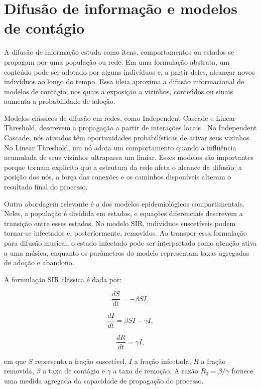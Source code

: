
\section{Difusão de informação e modelos de contágio}

A difusão de informação estuda como itens, comportamentos ou estados se propagam por uma população ou rede. Em uma formulação abstrata, um conteúdo pode ser adotado por alguns indivíduos e, a partir deles, alcançar novos indivíduos ao longo do tempo. Essa ideia aproxima a difusão informacional de modelos de contágio, nos quais a exposição a vizinhos, conteúdos ou sinais aumenta a probabilidade de adoção.

Modelos clássicos de difusão em redes, como Independent Cascade e Linear Threshold, descrevem a propagação a partir de interações locais \citep{kempe2003ic}. No Independent Cascade, nós ativados têm oportunidades probabilísticas de ativar seus vizinhos. No Linear Threshold, um nó adota um comportamento quando a influência acumulada de seus vizinhos ultrapassa um limiar. Esses modelos são importantes porque tornam explícito que a estrutura da rede afeta o alcance da difusão: a posição dos nós, a força das conexões e os caminhos disponíveis alteram o resultado final do processo.

Outra abordagem relevante é a dos modelos epidemiológicos compartimentais. Neles, a população é dividida em estados, e equações diferenciais descrevem a transição entre esses estados. No modelo SIR, indivíduos suscetíveis podem tornar-se infectados e, posteriormente, removidos. Ao transpor essa formulação para difusão musical, o estado infectado pode ser interpretado como atenção ativa a uma música, enquanto os parâmetros do modelo representam taxas agregadas de adoção e abandono.

A formulação SIR clássica é dada por:

\begin{equation}
\frac{dS}{dt} = -\beta SI,
\end{equation}

\begin{equation}
\frac{dI}{dt} = \beta SI - \gamma I,
\end{equation}

\begin{equation}
\frac{dR}{dt} = \gamma I,
\end{equation}

em que $S$ representa a fração suscetível, $I$ a fração infectada, $R$ a fração removida, $\beta$ a taxa de contágio e $\gamma$ a taxa de remoção. A razão $R_0 = \beta / \gamma$ fornece uma medida agregada da capacidade de propagação do processo.

